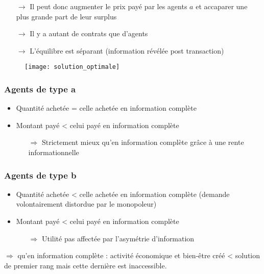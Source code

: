 \begin{enumerate}
\item[$\rightarrow$] Il peut donc augmenter le prix payé par les agents $a$ et accaparer une plus grande part de leur surplus
\item[$\rightarrow$] Il y a autant de contrats que d'agents
\item[$\rightarrow$] L'équilibre est séparant (information révélée post transaction)
\end{enumerate}
\begin{figure}[H]
	\centering
	\texttt{[image: solution\_optimale]}
\end{figure}

\subsubsection{Agents de type a}

\begin{itemize}
\item Quantité achetée = celle achetée en information complète
\item Montant payé < celui payé en information complète
	\begin{itemize}
	\item[$\Rightarrow$] Strictement mieux qu'en information complète grâce à une rente informationnelle
	\end{itemize}
\end{itemize}

\subsubsection{Agents de type b}

\begin{itemize}
\item Quantité achetée < celle achetée en information complète (demande volontairement distordue par le monopoleur)
\item Montant payé < celui payé en information complète
	\begin{itemize}
	\item[$\Rightarrow$] Utilité pas affectée par l’asymétrie d’information
	\end{itemize}
\end{itemize}

$\Rightarrow$  qu'en information complète
 : activité économique et bien-être créé < solution de premier rang mais cette dernière est inaccessible.


